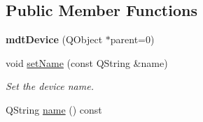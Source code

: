 \subsection*{Public Member Functions}
\begin{DoxyCompactItemize}
\item 
\hypertarget{classmdt_device_a6d501791e7243358cc61b144254b80db}{
{\bfseries mdtDevice} (QObject $\ast$parent=0)}
\label{classmdt_device_a6d501791e7243358cc61b144254b80db}

\item 
\hypertarget{classmdt_device_a80186f1aa6fbdc13f1652de978c35518}{
void \hyperlink{classmdt_device_a80186f1aa6fbdc13f1652de978c35518}{setName} (const QString \&name)}
\label{classmdt_device_a80186f1aa6fbdc13f1652de978c35518}

\begin{DoxyCompactList}\small\item\em Set the device name. \end{DoxyCompactList}\item 
\hypertarget{classmdt_device_a7ad893c6885dbaef5a6cb980bfe627e0}{
QString \hyperlink{classmdt_device_a7ad893c6885dbaef5a6cb980bfe627e0}{name} () const }
\label{classmdt_device_a7ad893c6885dbaef5a6cb980bfe627e0}


\end{DoxyCompactItemize}
